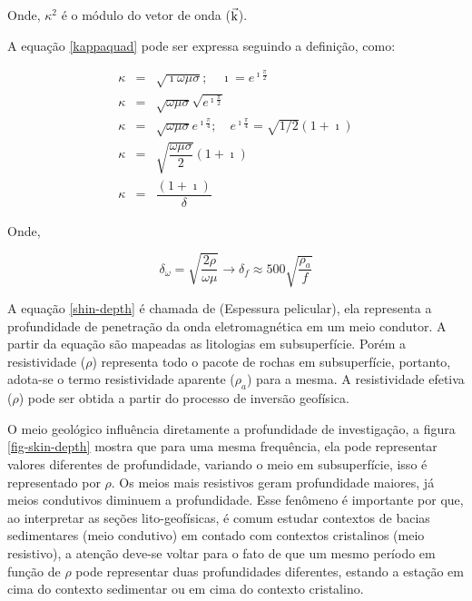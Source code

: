         \noindent Onde, $\kappa^2$ é o módulo do vetor de onda ($\vec{\textrm{k}}$).
        
        A equação \ref{kappaquad} pode ser expressa seguindo a definição, como:
        
        {\setlength\arraycolsep{2pt}
        \begin{eqnarray}
            \kappa & = & \sqrt{\imath \omega \mu \sigma}; \quad \imath = e^{\imath \frac{\pi}{2}} \nonumber \\
            \kappa & = & \sqrt{\omega \mu \sigma} \sqrt{e^{\imath \frac{\pi}{2}}} \nonumber \\
            \kappa & = & \sqrt{\omega \mu \sigma} e^{\imath \frac{\pi}{4}}; \quad e^{\imath \frac{\pi}{4}} = \sqrt{1/2} (1 + \imath) \nonumber \\
            \kappa & = & \sqrt{\dfrac{\omega \mu \sigma}{2}} (1 + \imath) \nonumber \\
            \kappa & = & \dfrac{(1 + \imath)}{\delta}
        \end{eqnarray}} 
        
        \noindent Onde,
        
        \begin{equation}
            \label{shin-depth}
            \delta_\omega = \sqrt{\dfrac{2 \rho}{\omega \mu}} \longrightarrow \delta_f \approx 500  \sqrt{\frac{\rho_a}{f}}
        \end{equation}
        
        A equação \ref{shin-depth} é chamada de  (Espessura pelicular), ela representa a profundidade de penetração da onda eletromagnética em um meio condutor.
        A partir da equação são mapeadas as litologias em subsuperfície. Porém a resistividade ($\rho$) representa todo o pacote de rochas em subsuperfície, portanto, adota-se o termo resistividade aparente ($\rho_a$) para a mesma. A resistividade efetiva ($\rho$) pode ser obtida a partir do processo de inversão geofísica.        

        O meio geológico influência diretamente a profundidade de investigação, a figura \ref{fig-skin-depth} mostra que para uma mesma frequência, ela pode representar valores diferentes de profundidade, variando o meio em subsuperfície, isso é representado por $\rho$. Os meios mais resistivos geram profundidade maiores, já meios condutivos diminuem a profundidade. Esse fenômeno é importante por que, ao interpretar as seções lito-geofísicas, é comum estudar contextos de bacias sedimentares (meio condutivo) em contado com contextos cristalinos (meio resistivo), a atenção deve-se voltar para o fato de que um mesmo período em função de $\rho$ pode representar duas profundidades diferentes, estando a estação em cima do contexto sedimentar ou em cima do contexto cristalino. 
        
